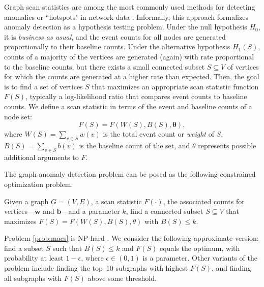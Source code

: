 Graph scan statistics are among the most commonly used methods for detecting anomalies or ``hotspots" in
network data \cite{Speakman-14,leiserson2015pan, hansen2016finding, neil2013scan, chen2014non}.
Informally, this approach formalizes anomaly detection as a hypothesis testing problem.
Under the null hypothesis $H_0$, it is \emph{business as usual}, and the event counts for all nodes are generated proportionally to their baseline counts. Under the alternative hypothesis $H_1(S)$, counts of a majority of
the vertices are generated (again) with rate proportional to the baseline counts, but there exists a small connected subset
$S \subseteq V$ of vertices for which the counts are generated at a higher rate than expected.
Then, the goal is to find a set of vertices $S$ that maximizes an appropriate scan statistic function $F(S)$, typically a log-likelihood ratio that compares event counts to baseline counts. We define a scan statistic in terms of the event and baseline counts of a node set:
$$
F(S) = F(W(S), B(S), \mathbf{\theta}),
$$
where $W(S) = \sum_{v \in S} w(v)$ is the total event count or \emph{weight} of $S$, $B(S) = \sum_{v \in S} b(v)$ is the baseline count of the set, and $\theta$ represents possible additional arguments to $F$.

The graph anomaly detection problem can be posed as the following constrained optimization problem.

\begin{problem}
\label{prob:macs}
Given a graph $G=(V, E)$, a scan statistic $F(\cdot)$, the associated counts for vertices---$\mathbf{w}$ and $\mathbf{b}$---and a parameter $k$, find a connected subset $S\subseteq V$ that maximizes $F(S) = F(W(S), B(S), \theta)$ with $B(S) \leq k$.
\end{problem}

Problem \ref{prob:macs} is NP-hard \cite{cadena:sdm17}. We consider the following approximate version: find a subset $S$ such that $B(S)\leq k$ and $F(S)$ equals the optimum, with probability at least $1-\epsilon$, where $\epsilon\in(0, 1)$ is a parameter. Other variants of the problem include finding the top--10 subgraphs with highest $F(S)$, and finding all subgraphs with $F(S)$ above some threshold.

